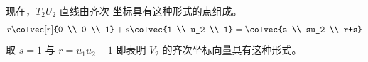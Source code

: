 \begin{exercises}
\begin{answer}
\begin{exparts}
\begin{equation*}
           \end{equation*}
           现在，$T_2U_2$ 直线由齐次
           坐标具有这种形式的点组成。
           \begin{equation*}
             r\colvec[r]{0 \\ 0 \\ 1}+s\colvec{1 \\ u_2 \\ 1}
             =\colvec{s \\ su_2 \\ r+s}
           \end{equation*}
           取 $s=1$ 与 $r=u_1u_2-1$ 即表明
           $V_2$ 的齐次坐标向量具有这种形式。
      \end{exparts}
    \end{answer}
\end{exercises}
\endinput
